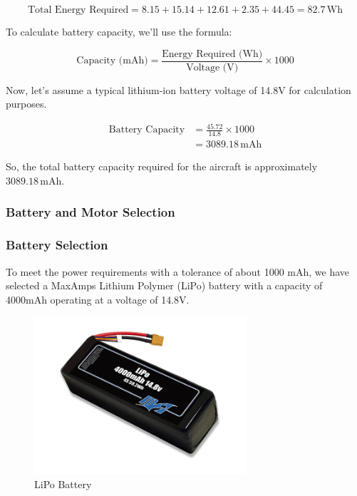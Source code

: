 \documentclass[12 pt]{article}
\begin{document}
\[
\text{Total Energy Required} = 8.15 + 15.14 + 12.61 + 2.35 + 44.45 = 82.7 \, \text{Wh}
\]

To calculate battery capacity, we'll use the formula:

\[
\text{Capacity (mAh)} = \frac{\text{Energy Required (Wh)}}{\text{Voltage (V)}} \times 1000
\]


Now, let's assume a typical lithium-ion battery voltage of 14.8V for calculation purposes.

\begin{align}
\text{Battery Capacity} &= \frac{45.72}{14.8} \times 1000 \\
& = 3089.18 \, \text{mAh}
\end{align}

%

So, the total battery capacity required for the aircraft is approximately $3089.18 \, \text{mAh}$.

\subsubsection{Battery and Motor Selection}

\subsubsection{Battery Selection}

To meet the power requirements with a tolerance of about 1000 mAh, we have selected a MaxAmps Lithium Polymer (LiPo) battery with a capacity of 4000mAh operating at a voltage of 14.8V.

\begin{figure}[h]
    \centering
    \includegraphics[width=0.7\textwidth]{LiPo-4000-4S-14.8v-Battery-Pack.jpg}
    \caption{LiPo Battery}
    \label{fig:battery}
\end{figure}
\end{document}
